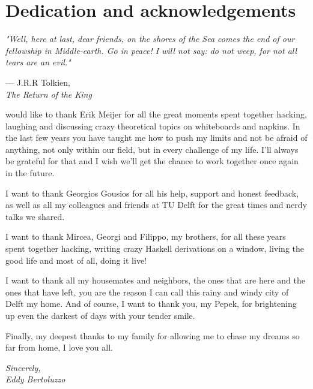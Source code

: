 %
%

\chapter*{Dedication and acknowledgements}
\epigraph{\hspace{4ex}\textit{"Well, here at last, dear friends, on the shores of the Sea comes the end of our fellowship in Middle-earth. Go in peace! I will not say: do not weep, for not all tears are an evil."}}{--- J.R.R Tolkien,\\ \textit{The Return of the King}}

\begin{SingleSpace}
 would like to thank Erik Meijer for all the great moments spent together hacking, laughing and discussing crazy theoretical topics on whiteboards and napkins. In the last few years you have taught me how to push my limits and not be afraid of anything, not only within our field, but in every challenge of my life. I'll always be grateful for that and I wish we'll get the chance to work together once again in the future.

I want to thank Georgios Gousios for all his help, support and honest feedback, as well as all my colleagues and friends at TU Delft for the great times and nerdy talks we shared. 

I want to thank Mircea, Georgi and Filippo, my brothers, for all these years spent together hacking, writing crazy Haskell derivations on a window, living the good life and most of all, doing it live!

I want to thank all my housemates and neighbors, the ones that are here and the ones that have left, you are the reason I can call this rainy and windy city of Delft my home. And of course, I want to thank you, my Pepek, for brightening up even the darkest of days with your tender smile.

Finally, my deepest thanks to my family for allowing me to chase my dreams so far from home, I love you all.

\begin{flushright}
\textit{Sincerely,}\\
\textit{Eddy Bertoluzzo}
\end{flushright}


\end{SingleSpace}
\clearpage
